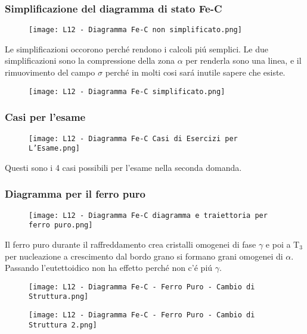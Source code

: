 \documentclass{article}
\begin{document}
{            \subsubsection{Simplificazione del diagramma di stato Fe-C}
                \begin{figure}[h!]
                    \centering
                    \texttt{[image: L12 - Diagramma Fe-C non simplificato.png]}
                \end{figure}
                Le simplificazioni occorono perch\'e rendono i calcoli pi\'u semplici. Le due simplificazioni sono la compressione della zona $\alpha$ per renderla sono una linea, e il rimuovimento del campo $\sigma$ perch\'e in molti cosi sar\'a inutile sapere che esiste. 
                \begin{figure}[h!]
                    \centering
                    \texttt{[image: L12 - Diagramma Fe-C simplificato.png]}
                \end{figure}
            \newpage
            \subsubsection{Casi per l'esame}
                \begin{figure}[h!]
                    \centering
                    \texttt{[image: L12 - Diagramma Fe-C Casi di Esercizi per L'Esame.png]}
                \end{figure}
                Questi sono i 4 casi possibili per l'esame nella seconda domanda.
            \subsubsection{Diagramma per il ferro puro}
                \begin{figure}[h!]
                    \centering
                    \texttt{[image: L12 - Diagramma Fe-C diagramma e traiettoria per ferro puro.png]}
                \end{figure}
                Il ferro puro durante il raffreddamento crea cristalli omogenei di fase $\gamma$ e poi a T$_3$ per nucleazione a crescimento dal bordo grano si formano grani omogenei di $\alpha$. Passando l'eutettoidico non ha effetto perch\'e non c'\'e pi\'u $\gamma$.
                \begin{figure}[h!]
                    \centering
                    \texttt{[image: L12 - Diagramma Fe-C - Ferro Puro - Cambio di Struttura.png]}
                \end{figure}
                \begin{figure}[h!]
                    \centering
                    \texttt{[image: L12 - Diagramma Fe-C - Ferro Puro - Cambio di Struttura 2.png]}
                \end{figure}
            \newpage
}
\end{document}
